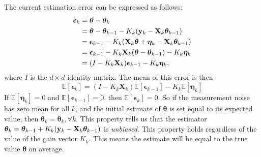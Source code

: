 The current estimation error can be expressed as follows:
\begin{align*}
	\boldsymbol{\epsilon}_k	&= \boldsymbol{\theta}-\boldsymbol{\theta}_k \\
							&= \boldsymbol{\theta}-\boldsymbol{\theta}_{k-1} - K_k ({\mathbf{y}}_k-\mathbf{X}_k\boldsymbol{\theta}_{k-1})\\
							&= \boldsymbol{\epsilon}_{k-1}-K_k (\mathbf{X}_k\boldsymbol{\theta}+\boldsymbol{\eta}_k-\mathbf{X}_k\boldsymbol{\theta}_{k-1})\\
							&= \boldsymbol{\epsilon}_{k-1}-K_k \mathbf{X}_k(\boldsymbol{\theta}-\boldsymbol{\theta}_{k-1})-K_k\boldsymbol{\eta}_k\\
							&= (I-K_k \mathbf{X}_k)\boldsymbol{\epsilon}_{k-1}-K_k\boldsymbol{\eta}_k,
\end{align*}
where $I$ is the $d\times d$ identity matrix. The mean of this error is then
$$\mathbb{E}[\boldsymbol{\epsilon}_{k}] = (I-K_k \mathbf{X}_k)\mathbb{E}[\boldsymbol{\epsilon}_{k-1}]-K_k\mathbb{E}[\boldsymbol{\eta}_{k}]$$
If $\mathbb{E}[\boldsymbol{\eta}_{k}]=0$ and $\mathbb{E}[\boldsymbol{\epsilon}_{k-1}]=0$, then $\mathbb{E}[\boldsymbol{\epsilon}_{k}]=0$. So if the measurement noise has zero mean for all $k$, and the initial estimate of $\boldsymbol{\theta}$ is set equal to its expected value, then $\boldsymbol{\theta}_k=\boldsymbol{\theta}_k, \forall k$. This property tells us that the estimator $\boldsymbol{\theta}_k = \boldsymbol{\theta}_{k-1}+K_k ({\mathbf{y}}_k-\mathbf{X}_k\boldsymbol{\theta}_{k-1})$ is \textit{unbiased}. This property holds regardless of the value of the gain vector $K_k$. This means the estimate will be equal to the true value $\boldsymbol{\theta}$ on average. 

